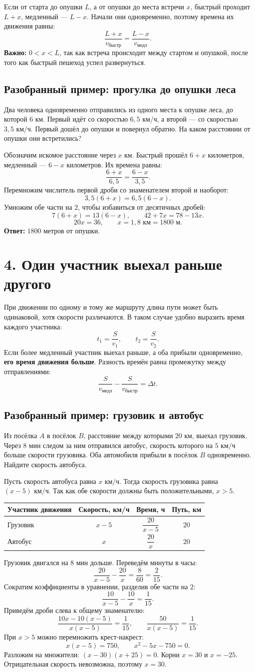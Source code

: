 \documentclass[a4paper,12pt]{article}
\newcommand{\topic}[1]{\section*{\color{darkaccent}#1}}
\newcommand{\subtopic}[1]{\subsection*{\color{accent}#1}}
\newcommand{\key}[1]{\textbf{\color{darkaccent}#1}}
\newcommand{\kmh}{\text{ км/ч}}
\newcommand{\kms}{\text{ км}}
\newcommand{\minu}{\text{ мин}}
\newcommand{\met}{\text{ м}}
\newcommand{\tabheaders}{\toprule Участник движения & Скорость, км/ч & Время, ч & Путь, км\\\midrule}
\begin{document}
Если от старта до опушки $L$, а от опушки до места встречи $x$, быстрый проходит $L+x$, медленный --- $L-x$. Начали они одновременно, поэтому времена их движения равны:
\[
\frac{L+x}{v_{\text{быстр}}}=\frac{L-x}{v_{\text{медл}}}.
\]
\textbf{Важно:} $0<x<L$, так как встреча происходит между стартом и опушкой, после того как быстрый пешеход успел развернуться.

\subtopic{Разобранный пример: прогулка до опушки леса}
Два человека одновременно отправились из одного места к опушке леса, до которой $6\kms$. Первый идёт со скоростью $6{,}5\kmh$, а второй --- со скоростью $3{,}5\kmh$. Первый дошёл до опушки и повернул обратно. На каком расстоянии от опушки они встретились?

Обозначим искомое расстояние через $x\kms$. Быстрый прошёл $6+x$ километров, медленный --- $6-x$ километров. Их времена равны:
\[
\frac{6+x}{6{,}5}=\frac{6-x}{3{,}5}.
\]
Перемножим числитель первой дроби со знаменателем второй и наоборот:
\[
3{,}5(6+x)=6{,}5(6-x).
\]
Умножим обе части на $2$, чтобы избавиться от десятичных дробей:
\[
7(6+x)=13(6-x),\qquad 42+7x=78-13x.
\]
\[
20x=36,\qquad x=1{,}8\kms=1800\met.
\]
\key{Ответ:} $1800$ метров от опушки.

\topic{4. Один участник выехал раньше другого}
При движении по одному и тому же маршруту длина пути может быть одинаковой, хотя скорости различаются. В таком случае удобно выразить время каждого участника:
\[
t_{1}=\frac{S}{v_{1}},\qquad t_{2}=\frac{S}{v_{2}}.
\]
Если более медленный участник выехал раньше, а оба прибыли одновременно, \key{его время движения больше}. Разность времён равна промежутку между отправлениями:
\[
\frac{S}{v_{\text{медл}}}-\frac{S}{v_{\text{быстр}}}=\Delta t.
\]

\subtopic{Разобранный пример: грузовик и автобус}
Из посёлка $A$ в посёлок $B$, расстояние между которыми $20\kms$, выехал грузовик. Через $8\minu$ следом за ним отправился автобус, скорость которого на $5\kmh$ больше скорости грузовика. Оба автомобиля прибыли в посёлок $B$ одновременно. Найдите скорость автобуса.

Пусть скорость автобуса равна $x\kmh$. Тогда скорость грузовика равна $(x-5)\kmh$. Так как обе скорости должны быть положительными, $x>5$.
\begin{center}
\renewcommand{\arraystretch}{1.2}
\begin{tabularx}{\linewidth}{Xccc}
\tabheaders
Грузовик & $x-5$ & $\dfrac{20}{x-5}$ & $20$\\[5pt]
Автобус & $x$ & $\dfrac{20}{x}$ & $20$\\[5pt]
\bottomrule
\end{tabularx}
\end{center}
Грузовик двигался на $8\minu$ дольше. Переведём минуты в часы:
\[
\frac{20}{x-5}-\frac{20}{x}=\frac{8}{60}=\frac{2}{15}.
\]
Сократим коэффициенты в уравнении, разделив обе части на $2$:
\[
\frac{10}{x-5}-\frac{10}{x}=\frac{1}{15}.
\]
Приведём дроби слева к общему знаменателю:
\[
\frac{10x-10(x-5)}{x(x-5)}=\frac{1}{15},\qquad
\frac{50}{x(x-5)}=\frac{1}{15}.
\]
При $x>5$ можно перемножить крест-накрест:
\[
x(x-5)=750,\qquad x^2-5x-750=0.
\]
Разложим на множители: $(x-30)(x+25)=0$. Корни $x=30$ и $x=-25$. Отрицательная скорость невозможна, поэтому $x=30$.
\end{document}
